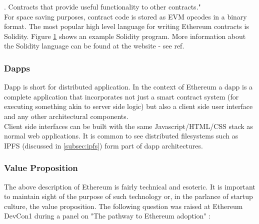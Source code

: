 . Contracts that provide useful functionality to other contracts."\\


For space saving purposes, contract code is stored as EVM opcodes in a binary format. The most popular high level language for writing Ethereum contracts is Solidity\cite{Solidity}. Figure \ref{fig:Simplestorage} shows an example Solidity program. More information about the Solidity language can be found at the website - see ref.\\

\begin{figure}
\centering
{}
\decoRule
\caption[]{}
\label{fig:Simplestorage}
\end{figure}

\subsubsection{Dapps}
Dapp is short for distributed application. In the context of Ethereum a dapp is a complete application that incorporates not just a smart contract system (for executing something akin to server side logic) but also a client side user interface and any other architectural components. \\

Client side interfaces can be built with the same Javascript/HTML/CSS stack as normal web applications. It is common to see distributed filesystems such as IPFS (discussed in \ref{subsec:ipfs}) form part of dapp architectures. 

\subsubsection{Value Proposition}
The above description of Ethereum is fairly technical and esoteric. It is important to maintain sight of the purpose of such technology or, in the parlance of startup culture, the value proposition. The following question was raised at Ethereum DevCon1 during a panel on "The pathway to Ethereum adoption" \cite{devconvid}:\\

